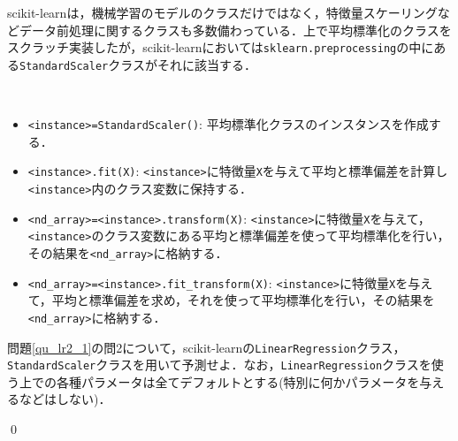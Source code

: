 scikit-learnは，機械学習のモデルのクラスだけではなく，特徴量スケーリングなどデータ前処理に関するクラスも多数備わっている．上で平均標準化のクラスをスクラッチ実装したが，scikit-learnにおいては\texttt{sklearn.preprocessing}の中にある\texttt{StandardScaler}クラスがそれに該当する．
\begin{gram}　
\begin{itemize}
\item \texttt{<instance>=StandardScaler()}: 平均標準化クラスのインスタンスを作成する．
\item \texttt{<instance>.fit(X)}: \texttt{<instance>}に特徴量\texttt{X}を与えて平均と標準偏差を計算し\texttt{<instance>}内のクラス変数に保持する．
\item \texttt{<nd\_array>=<instance>.transform(X)}: \texttt{<instance>}に特徴量\texttt{X}を与えて，\texttt{<instance>}のクラス変数にある平均と標準偏差を使って平均標準化を行い，その結果を\texttt{<nd\_array>}に格納する．
\item \texttt{<nd\_array>=<instance>.fit\_transform(X)}: \texttt{<instance>}に特徴量\texttt{X}を与えて，平均と標準偏差を求め，それを使って平均標準化を行い，その結果を\texttt{<nd\_array>}に格納する．
\end{itemize}
\end{gram}

\begin{qu}
問題\ref{qu_lr2_1}の問2について，scikit-learnの\texttt{LinearRegression}クラス，\texttt{StandardScaler}クラスを用いて予測せよ．なお，\texttt{LinearRegression}クラスを使う上での各種パラメータは全てデフォルトとする(特別に何かパラメータを与えるなどはしない)．
\end{qu}
\begin{ans}
\begin{cod}[\texttt{lr17.py}]　
}]{code/lr17.py}
\vspace{-10pt}
\begin{lstlisting}
y_pred=411410.5372498779
\end{lstlisting}
\end{cod}
\vspace{-10pt}
\qed	
\end{ans}





